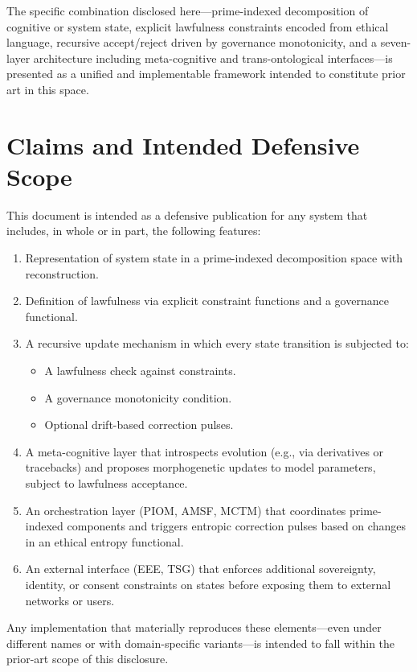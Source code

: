 \documentclass[11pt]{article}
\begin{document}
The specific combination disclosed here---prime-indexed decomposition of cognitive or system state, explicit lawfulness constraints encoded from ethical language, recursive accept/reject driven by governance monotonicity, and a seven-layer architecture including meta-cognitive and trans-ontological interfaces---is presented as a unified and implementable framework intended to constitute prior art in this space.

\section{Claims and Intended Defensive Scope}

This document is intended as a defensive publication for any system that includes, in whole or in part, the following features:

\begin{enumerate}
  \item Representation of system state in a prime-indexed decomposition space with reconstruction.
  \item Definition of lawfulness via explicit constraint functions and a governance functional.
  \item A recursive update mechanism in which every state transition is subjected to:
    \begin{itemize}
      \item A lawfulness check against constraints.
      \item A governance monotonicity condition.
      \item Optional drift-based correction pulses.
    \end{itemize}
  \item A meta-cognitive layer that introspects evolution (e.g., via derivatives or tracebacks) and proposes morphogenetic updates to model parameters, subject to lawfulness acceptance.
  \item An orchestration layer (PIOM, AMSF, MCTM) that coordinates prime-indexed components and triggers entropic correction pulses based on changes in an ethical entropy functional.
  \item An external interface (EEE, TSG) that enforces additional sovereignty, identity, or consent constraints on states before exposing them to external networks or users.
\end{enumerate}

Any implementation that materially reproduces these elements---even under different names or with domain-specific variants---is intended to fall within the prior-art scope of this disclosure.
\end{document}
